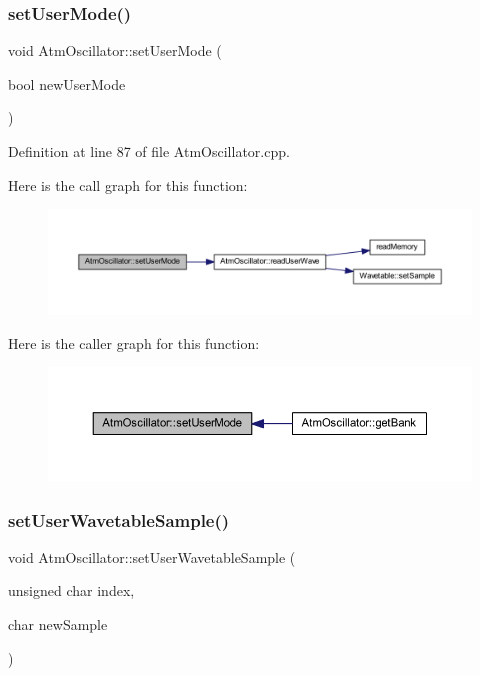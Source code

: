 \subsubsection{\texorpdfstring{set\+User\+Mode()}{setUserMode()}}
{\footnotesize\ttfamily void Atm\+Oscillator\+::set\+User\+Mode (\begin{DoxyParamCaption}\item[{bool}]{new\+User\+Mode }\end{DoxyParamCaption})}



Definition at line 87 of file Atm\+Oscillator.\+cpp.

Here is the call graph for this function\+:
\nopagebreak
\begin{figure}[H]
\begin{center}
\leavevmode
\includegraphics[width=350pt]{d8/d5f/class_atm_oscillator_aafaccbb54d52f2c0eb07eb968498eef4_cgraph}
\end{center}
\end{figure}
Here is the caller graph for this function\+:
\nopagebreak
\begin{figure}[H]
\begin{center}
\leavevmode
\includegraphics[width=350pt]{d8/d5f/class_atm_oscillator_aafaccbb54d52f2c0eb07eb968498eef4_icgraph}
\end{center}
\end{figure}
\mbox{\label{class_atm_oscillator_aa62dba14693f65adcb3daa7aa4757ba1}} 
\subsubsection{\texorpdfstring{set\+User\+Wavetable\+Sample()}{setUserWavetableSample()}}
{\footnotesize\ttfamily void Atm\+Oscillator\+::set\+User\+Wavetable\+Sample (\begin{DoxyParamCaption}\item[{unsigned char}]{index,  }\item[{char}]{new\+Sample }\end{DoxyParamCaption})}



